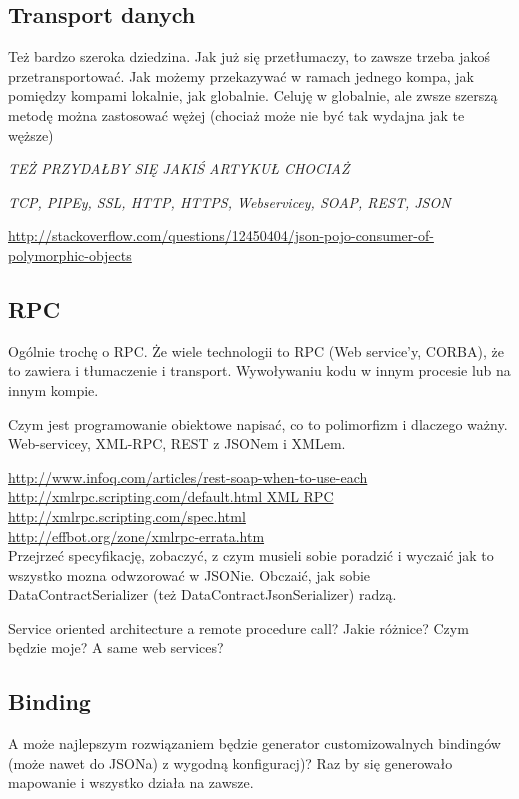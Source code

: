 \subsection{Transport danych}
Też bardzo szeroka dziedzina. Jak już się przetłumaczy, to zawsze trzeba jakoś przetransportować. Jak możemy przekazywać w ramach jednego kompa, jak pomiędzy kompami lokalnie, jak globalnie.
Celuję w globalnie, ale zwsze szerszą metodę można zastosować wężej (chociaż może nie być tak wydajna jak te węższe)

\emph{TEŻ PRZYDAŁBY SIĘ JAKIŚ ARTYKUŁ CHOCIAŻ}

\emph{TCP, PIPEy, SSL, HTTP, HTTPS, Webservicey, SOAP, REST, JSON}

\url{http://stackoverflow.com/questions/12450404/json-pojo-consumer-of-polymorphic-objects}

\subsection{RPC}
Ogólnie trochę o RPC. Że wiele technologii to RPC (Web service'y, CORBA), że to zawiera i tłumaczenie i transport.
Wywoływaniu kodu w innym procesie lub na innym kompie.

Czym jest programowanie obiektowe napisać, co to polimorfizm i dlaczego ważny. Web-servicey, XML-RPC, REST z JSONem i XMLem.

\url{http://www.infoq.com/articles/rest-soap-when-to-use-each}\\

\url{http://xmlrpc.scripting.com/default.html XML RPC}\\
\url{http://xmlrpc.scripting.com/spec.html}\\
\url{http://effbot.org/zone/xmlrpc-errata.htm}\\
Przejrzeć specyfikację, zobaczyć, z czym musieli sobie poradzić i wyczaić jak to wszystko mozna odwzorować w JSONie. Obczaić, jak sobie DataContractSerializer (też DataContractJsonSerializer) radzą. 

Service oriented architecture a remote procedure call? Jakie różnice? Czym będzie moje? A same web services?

\subsection{Binding}
A może najlepszym rozwiązaniem będzie generator customizowalnych bindingów (może nawet do JSONa) z wygodną konfiguracj)? Raz by się generowało mapowanie i wszystko działa na zawsze. 

